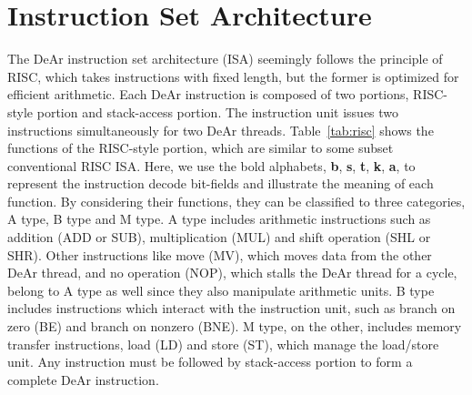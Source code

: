 \section{Instruction Set Architecture}
\label{sec:isa}
\indent The DeAr instruction set architecture (ISA) seemingly follows the principle of RISC, which takes instructions with fixed length, 
but the former is optimized for efficient arithmetic.
Each DeAr instruction is composed of two portions, RISC-style portion and stack-access portion.
The instruction unit issues two instructions simultaneously for two DeAr threads.
Table~\ref{tab:risc} shows the functions of the RISC-style portion, which are similar to some subset conventional RISC ISA.
Here, we use the bold alphabets, \textbf{b}, \textbf{s}, \textbf{t}, \textbf{k}, \textbf{a}, 
to represent the instruction decode bit-fields and illustrate the meaning of each function.
By considering their functions, they can be classified to three categories, A type, B type and M type.
A type includes arithmetic instructions such as addition (ADD or SUB), multiplication (MUL) and shift operation (SHL or SHR).
Other instructions like move (MV), which moves data from the other DeAr thread, 
and no operation (NOP), which stalls the DeAr thread for a cycle, 
belong to A type as well since they also manipulate arithmetic units.
B type includes instructions which interact with the instruction unit, such as branch on zero (BE) and branch on nonzero (BNE).
M type, on the other, includes memory transfer instructions, load (LD) and store (ST), which manage the load/store unit.
Any instruction must be followed by stack-access portion to form a complete DeAr instruction.
